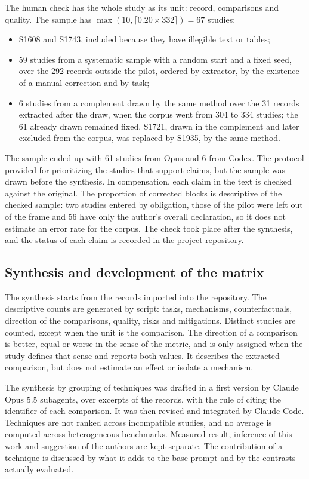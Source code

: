 The human check has the whole study as its unit: record, comparisons and quality. The sample has
$\max(10, \lceil 0.20 \times 332\rceil) = 67$ studies:
\begin{itemize}
  \item S1608 and S1743, included because they have illegible text or tables;
  \item 59 studies from a systematic sample with a random start and a fixed seed, over the 292 records outside the pilot,
  ordered by extractor, by the existence of a manual correction and by task;
  \item 6 studies from a complement drawn by the same method over the 31 records extracted after the draw,
  when the corpus went from 304 to 334 studies; the 61 already drawn remained fixed. S1721, drawn in the complement
  and later excluded from the corpus, was replaced by S1935, by the same method.
\end{itemize}
The sample ended up with 61 studies from Opus and 6 from Codex. The protocol provided for prioritizing the studies that support
claims, but the sample was drawn before the synthesis. In compensation, each claim in the text is checked against the
original. The proportion of corrected blocks is descriptive of the
checked sample: two studies entered by obligation, those of the pilot were left out of the frame and 56 have only the author's
overall declaration, so it does not estimate an error rate for the corpus. The
check took place after the synthesis, and the status of each claim is recorded in the project repository.

\subsection{Synthesis and development of the matrix}
The synthesis starts from the records imported into the repository. The descriptive counts are generated by script:
tasks, mechanisms, counterfactuals, direction of the comparisons, quality, risks and mitigations. Distinct studies
are counted, except when the unit is the comparison. The direction of a comparison is better, equal or worse in the sense
of the metric, and is only assigned when the study defines that sense and reports both values. It describes the
extracted comparison, but does not estimate an effect or isolate a mechanism.

The synthesis by grouping of techniques was drafted in a first version by Claude Opus 5.5 subagents, over
excerpts of the records, with the rule of citing the identifier of each comparison. It was then revised and integrated by
Claude Code. Techniques are not ranked across incompatible studies, and no average is computed across
heterogeneous benchmarks. Measured result, inference of this work and suggestion of the authors are kept
separate. The contribution of a technique is discussed by what it adds to the base prompt and by the contrasts
actually evaluated.


